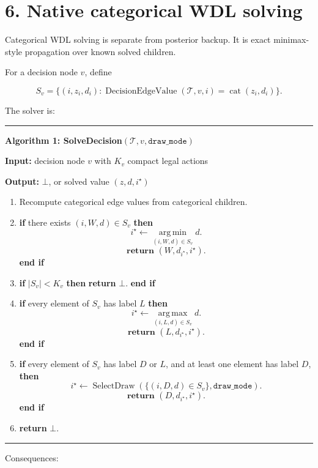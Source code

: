 \documentclass[11pt]{article}
\newcommand{\argmax}{\operatorname*{arg\,max}}
\newcommand{\argmin}{\operatorname*{arg\,min}}
\newcommand{\Tree}{\mathcal{T}}
\newcommand{\Cat}{\operatorname{cat}}
\newcommand{\SelectDraw}{\operatorname{SelectDraw}}
\newcommand{\DecisionEdgeValue}{\operatorname{DecisionEdgeValue}}
\newenvironment{algorithmblock}[1]
{
  \par\medskip
  \noindent\hrule\par\smallskip
  \noindent\textbf{#1}
  \par\smallskip
}
{
  \par\smallskip\noindent\hrule\par\medskip
}
\newcommand{\Input}{\textbf{Input: }}
\newcommand{\Output}{\textbf{Output: }}
\newcommand{\Return}{\textbf{return }}
\newcommand{\If}{\textbf{if }}
\newcommand{\Then}{\textbf{ then }}
\newcommand{\EndIf}{\textbf{end if}}
\begin{document}
\section*{6. Native categorical WDL solving}

Categorical WDL solving is separate from posterior backup. It is exact
minimax-style propagation over known solved children.

For a decision node \(v\), define

\[
S_v=\{(i,z_i,d_i):\DecisionEdgeValue(\Tree,v,i)=\Cat(z_i,d_i)\}.
\]

The solver is:

\begin{algorithmblock}{Algorithm 1: SolveDecision\((\Tree,v,\texttt{draw\_mode})\)}

\Input decision node \(v\) with \(K_v\) compact legal actions

\Output \(\bot\), or solved value \((z,d,i^\star)\)

\begin{enumerate}[leftmargin=2em]
  \item Recompute categorical edge values from categorical children.

  \item \If there exists \((i,W,d)\in S_v\) \Then
  \[
  i^\star\gets\argmin_{(i,W,d)\in S_v} d.
  \]
  \[
  \Return (W,d_{i^\star},i^\star).
  \]
  \EndIf

  \item \If \(|S_v|<K_v\) \Then \Return \(\bot\). \EndIf

  \item \If every element of \(S_v\) has label \(L\) \Then
  \[
  i^\star\gets\argmax_{(i,L,d)\in S_v} d.
  \]
  \[
  \Return (L,d_{i^\star},i^\star).
  \]
  \EndIf

  \item \If every element of \(S_v\) has label \(D\) or \(L\), and at least one
  element has label \(D\), \Then
  \[
  i^\star\gets\SelectDraw(\{(i,D,d)\in S_v\},\texttt{draw\_mode}).
  \]
  \[
  \Return (D,d_{i^\star},i^\star).
  \]
  \EndIf

  \item \Return \(\bot\).
\end{enumerate}

\end{algorithmblock}

Consequences:
\end{document}
